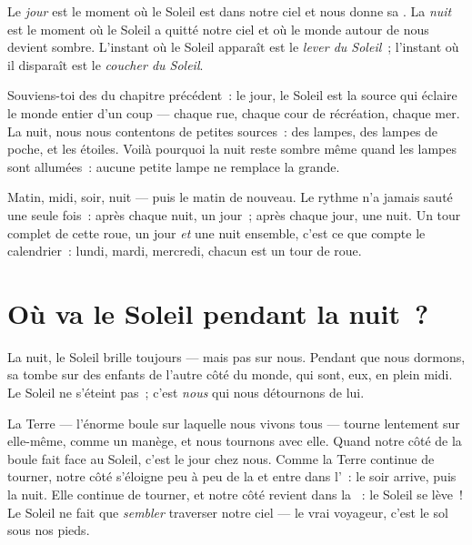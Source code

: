 \begin{definition}\label{def:g1:day-and-night:daynight}
Le \emph{jour} est le moment où le Soleil est dans notre
ciel et nous donne sa . La \emph{nuit} est le
moment où le Soleil a quitté notre ciel et où le monde autour de nous
devient sombre. L'instant où le Soleil apparaît est le \emph{lever du
Soleil}~; l'instant où il disparaît est le
\emph{coucher du Soleil}.
\end{definition}

\begin{remark}\label{rem:g1:day-and-night:lamp}
Souviens-toi des  du chapitre précédent~: le jour,
le Soleil est la source qui éclaire le monde entier d'un coup ---
chaque rue, chaque cour de récréation, chaque mer. La nuit, nous nous
contentons de petites sources~: des lampes, des lampes de poche, et
les étoiles. Voilà pourquoi la nuit reste sombre même quand les
lampes sont allumées~: aucune petite lampe ne remplace la grande.
\end{remark}

\begin{example}\label{ex:g1:day-and-night:rhythm}
Matin, midi, soir, nuit --- puis le matin de nouveau. Le rythme n'a
jamais sauté une seule fois~: après chaque nuit, un jour~; après
chaque jour, une nuit. Un tour complet de cette roue, un jour
\emph{et} une nuit ensemble, c'est ce que compte le calendrier~:
lundi, mardi, mercredi, chacun est un tour de roue.
\end{example}

\section{Où va le Soleil pendant la nuit~?}

La nuit, le Soleil brille toujours --- mais pas sur nous. Pendant que
nous dormons, sa  tombe sur des enfants de l'autre côté du
monde, qui sont, eux, en plein midi. Le Soleil ne s'éteint pas~; c'est
\emph{nous} qui nous détournons de lui.

\begin{example}\label{ex:g1:day-and-night:spinning}
La Terre --- l'énorme boule sur laquelle nous vivons tous --- tourne
lentement sur elle-même, comme un manège, et nous tournons avec elle.
Quand notre côté de la boule fait face au Soleil, c'est le jour chez
nous. Comme la Terre continue de tourner, notre côté s'éloigne peu à
peu de la  et entre dans l'~: le soir arrive, puis la
nuit. Elle continue de tourner, et notre côté revient dans la
~: le Soleil se lève~! Le Soleil ne fait que \emph{sembler}
traverser notre ciel --- le vrai voyageur, c'est le sol sous nos
pieds.
\end{example}

